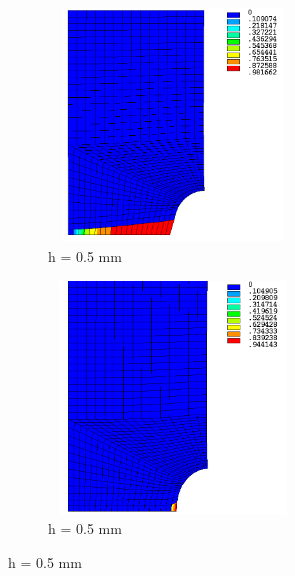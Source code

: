 \documentclass[12pt,a4paper,twoside,openright]{report}
\begin{document}
\begin{figure}[htbp!]\ContinuedFloat 
     \begin{subfigure}{0.4\textwidth}
         \includegraphics[width=6.6cm,height=6.2cm]{25.d1-0.5-r.png}
         \caption{h = 0.5 mm}
         \label{fig:d1-0.5-r}
     \end{subfigure}   
     \hspace{1.8cm}
     \begin{subfigure}{0.4\textwidth}
         \includegraphics[width=6.6cm,height=6.2cm]{25.d1-0.5-nr.png}
         \caption{h = 0.5 mm}
         \label{fig:d1-0.5-nr}
     \end{subfigure}
\end{figure}
\FloatBarrier
\end{document}

